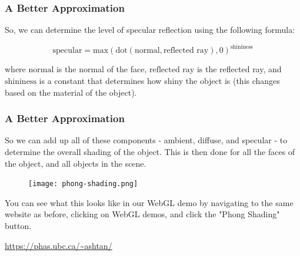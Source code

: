 \documentclass[12pt]{beamer}
\begin{document}
  \begin{frame}
    \frametitle{A Better Approximation}

    So, we can determine the level of specular reflection using the following formula:

    \begin{equation}
      \text{specular} = \text{max}(\text{dot}(\text{normal}, \text{reflected ray}), 0)^{\text{shininess}}\label{eq:specular}
    \end{equation}

    where $\text{normal}$ is the normal of the face, $\text{reflected ray}$ is the reflected ray, and $\text{shininess}$ is a constant that determines how shiny the object is (this changes based on the material of the object).

  \end{frame}

  \begin{frame}
    \frametitle{A Better Approximation}

    So we can add up all of these components - ambient, diffuse, and specular - to determine the overall shading of the object.
    This is then done for all the faces of the object, and all objects in the scene.

    \begin{figure}
      \centering
      \texttt{[image: phong-shading.png]}\label{fig:phong-shading}
    \end{figure}

    You can see what this looks like in our WebGL demo by navigating to the same website as before, clicking on WebGL demos, and click the "Phong Shading" button.

    \url{https://phas.ubc.ca/~ashtan/}

  \end{frame}



\end{document}
